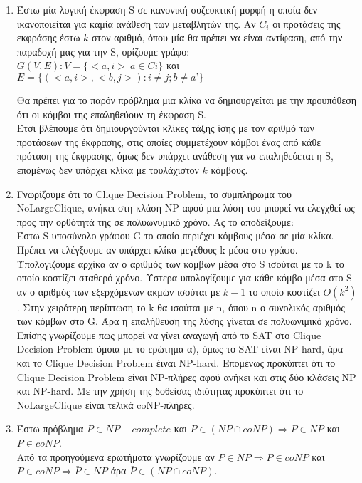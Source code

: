 \documentclass{article}
\begin{document}
\begin{enumerate}
    \item{}
Έστω μία λογική έκφραση S σε κανονική συζευκτική μορφή η οποία δεν ικανοποιείται για καμία ανάθεση των μεταβλητών της.
Αν $C_i$ οι προτάσεις της εκφράσης έστω $k$ στον αριθμό, όπου μία θα πρέπει να είναι αντίφαση, από την
παραδοχή μας για την S, ορίζουμε γράφο:\\ \break
$G(V,E) : V=\{<a,i>\:a\in Ci \}$ και $E = \{(<a,i>,<b,j>):i \neq j ; b \neq a’\}$\\ \break

Θα πρέπει για το παρόν πρόβλημα μια κλίκα να δημιουργείται με την προυπόθεση ότι οι κόμβοι της 
επαληθεύουν τη έκφραση S.\\

Έτσι βλέπουμε ότι δημιουργούνται κλίκες τάξης ίσης με τον αριθμό των προτάσεων της έκφρασης, στις οποίες συμμετέχουν
κόμβοι ένας από κάθε πρόταση της έκφρασης, όμως δεν υπάρχει ανάθεση για να επαληθεύεται η S, επομένως 
δεν υπάρχει κλίκα με τουλάχιστον $k$ κόμβους.\\

    \item{}
Γνωρίζουμε ότι το Clique Decision Problem, το συμπλήρωμα του NoLargeClique, ανήκει στη κλάση NP αφού 
μια λύση του μπορεί να ελεγχθεί ως προς την ορθότητά της σε πολυωνυμικό χρόνο. Ας το αποδείξουμε:\\

Έστω S υποσύνολο γράφου G το οποίο περιέχει κόμβους μέσα σε μία κλίκα. Πρέπει να ελέγξουμε αν υπάρχει 
κλίκα μεγέθους k μέσα στο γράφο. Υπολογίζουμε αρχίκα αν ο αριθμός των κόμβων μέσα στο S ισούται με το k 
το οποίο κοστίζει σταθερό χρόνο. Ύστερα υπολογίζουμε για κάθε κόμβο μέσα στο S αν ο αριθμός των εξερχόμενων
ακμών ισούται με $k-1$ το οποίο κοστίζει $O(k^2)$. Στην χειρότερη περίπτωση το k θα ισούται με n, όπου n
ο συνολικός αριθμός των κόμβων στο G. Άρα η επαλήθευση της λύσης γίνεται σε πολυωνιμικό χρόνο.\\

Επίσης γνωρίζουμε πως μπορεί να γίνει αναγωγή από το SAT στο Clique Decision Problem όμοια με το ερώτημα α),
όμως το SAT είναι NP-hard, άρα και το Clique Decision Problem έιναι NP-hard. Επομένως προκύπτει ότι το Clique 
Decision Problem είναι NP-πλήρες αφού ανήκει και στις δύο κλάσεις NP και NP-hard. Με την χρήση της
δοθείσας ιδιότητας προκύπτει ότι το NoLargeClique είναι τελικά coNP-πλήρες.\\

    \item{}
Έστω πρόβλημα $P \in NP-complete$ και $P \in (NP \cap coNP) \Rightarrow P \in NP$ και $P \in coNP$.\\\break
Από τα προηγούμενα ερωτήματα γνωρίζουμε αν $P \in NP \Rightarrow \bar{P} \in coNP$ και $P \in coNP 
\Rightarrow \bar{P} \in NP$ άρα $\bar{P} \in (NP \cap coNP)$.\\\break


\end{enumerate}
\end{document}
